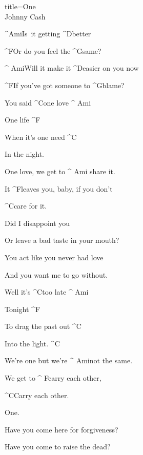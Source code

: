 \begin{song}{title=\predtitle\centering One \\\large Johnny Cash  \vspace*{-.3cm}}  %
\begin{centerjustified}
\begin{varwidth}[t]{0.57\textwidth}\setlength{\parindent}{0.45cm}  %

\sloka
 	^{Ami\z}Is~it getting ^{D\z}better

	^{F\z}Or do you feel the ^{G\z}same?

	^{ Ami}Will it make it ^{D\z}easier on you now

	^{F\z}If you've got someone to ^{\z G}blame?


	You said ^{C}one love ^{ Ami}

	One life ^{F}

	When it's one need ^{C}

	In the night.
  
	One love, we get to ^{ Ami\,\,}share it.

	It ^{F\z}leaves you, baby, if you don't

	^{C\z}care for it.


\sloka
	Did I disappoint you

	Or leave a bad taste in your mouth?

	You act like you never had love

	And you want me to go without.

	Well it's ^{C}too late ^{ Ami}

	Tonight ^{F}

	To drag the past out ^{C}

	Into the light. ^{C}

	We're one but we're ^{ Ami}not the same.

	We get to ^{ F}carry each other,

	^{C}Carry each other.

	One.

\end{varwidth}\mezisloupci\begin{varwidth}[t]{0.55\textwidth}\setlength{\parindent}{0.45cm}
\vspace*{0.3625cm}  %

\sloka
	Have you come here for forgiveness?

	Have you come to raise the dead?


\end{varwidth}
\end{centerjustified}
\end{song}
